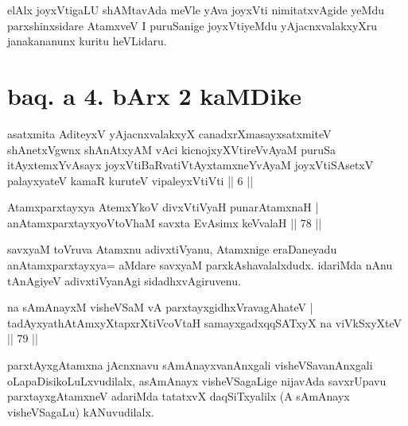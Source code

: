 \begin{artha}
elAlx joyxVtigaLU shAMtavAda meVle yAva joyxVti nimitatxvAgide yeMdu parxshinxsidare AtamxveV I puruSanige joyxVtiyeMdu yAjacnxvalakxyXru janakananunx kuritu heVLidaru.
\end{artha}

\section*{baq. a 4. bArx 2 kaMDike}

\begin{shl}
asatxmita AditeyxV yAjacnxvalakxyX canadxrXmasayxsatxmiteV shAnetxV\s gwnx shAnAtxyAM vAci kicnojxyXVtireVvAyaM puruSa itAyxtemxYvAsayx joyxVtiBaRvatiVtAyxtamxneYvAyaM joyxVtiSAsetxV palayxyateV kamaR kuruteV vipaleyxVtiVti || 6 ||
\end{shl}


\begin{shl}
Atamx\footnotemark[1]{}parxtayxya AtemxYkoV divxVtiVyaH punarAtamxnaH | \\
anAtamxparxtayxyoV\s toV\s haM savxta EvAsimx keVvalaH \hfill||  78 ||  
\end{shl}

\begin{artha}
savxyaM toVruva Atamxnu adivxtiVyanu, Atamxnige eraDaneyadu anAtamxparxtayxya= aMdare savxyaM parxkAshavalalxdudx. idariMda nAnu tAnAgiyeV adivxtiVyanAgi sidadhxvAgiruvenu.
\end{artha}


\begin{shl}
na sAmAnayxM visheVSaM vA parxtayxgidhxVravagAhateV | \\
tadAyxyathAtAmxyXtapxrXtiVcoV\s taH samayxgadxqqSATxyX na viVkSxyXteV \hfill||  79 ||  
\end{shl}

\begin{artha}
parxtAyxgAtamxna jAcnxnavu sAmAnayxvanAnxgali visheVSavanAnxgali oLapaDisikoLuLxvudilalx, asAmAnayx visheVSagaLige nijavAda savxrUpavu parxtayxgAtamxneV adariMda tatatxvX daqSiTxyalilx (A sAmAnayx visheVSagaLu) kANuvudilalx.
\end{artha}

